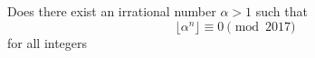 Does there exist an irrational number $\alpha > 1$ such that
\[\lfloor \alpha^n \rfloor \equiv 0 \pmod{2017}\]for all integers 